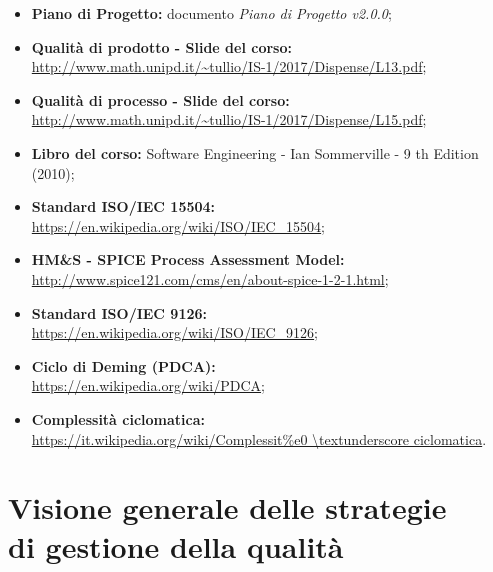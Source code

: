 \documentclass[openany,12pt,a4paper]{report}
\begin{document}
    \begin{itemize}
        \item \textbf{Piano di Progetto:} documento \textit{Piano di Progetto v2.0.0};
        
        \item \textbf{Qualità di prodotto - Slide del corso:} 
        \\ \url{http://www.math.unipd.it/~tullio/IS-1/2017/Dispense/L13.pdf};
        
        \item \textbf{Qualità di processo - Slide del corso:} \\ \url{http://www.math.unipd.it/~tullio/IS-1/2017/Dispense/L15.pdf};
        
        \item \textbf{Libro del corso:} Software Engineering - Ian Sommerville - 9 th Edition (2010);
        
        \item \textbf{Standard ISO/IEC 15504:} 
        \\ \url{https://en.wikipedia.org/wiki/ISO/IEC_15504};
        
        \item \textbf{HM\&S - SPICE Process Assessment Model:} 
        \\ \url{http://www.spice121.com/cms/en/about-spice-1-2-1.html};
        
        \item \textbf{Standard ISO/IEC 9126:}
        \\ \url{https://en.wikipedia.org/wiki/ISO/IEC_9126};
        
        \item \textbf{Ciclo di Deming (PDCA):} 
        \\ \url{https://en.wikipedia.org/wiki/PDCA};
        
        \item \textbf{Complessità ciclomatica:} 
        \\ \url{https://it.wikipedia.org/wiki/Complessit\%e0 \textunderscore ciclomatica}.
    \end{itemize}


\chapter{Visione generale delle strategie \\ di gestione della qualità}
    
\end{document}
